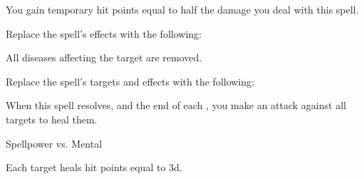 
You gain temporary hit points equal to half the damage you deal with this spell.









Replace the spell's effects with the following:
\begin{spellcontent}

\begin{augmenteffects}



\spelleffect
All diseases affecting the target are removed.








\end{augmenteffects}

\end{spellcontent}








Replace the spell's targets and effects with the following:
\begin{spellcontent}

\begin{augmenttargetinginfo}




\end{augmenttargetinginfo}


\begin{augmenteffects}



\spelleffect
When this spell resolves, and the end of each , you make an attack against all targets to heal them.




\begin{spellattack}{Spellpower vs. Mental}


\hit
Each target heals hit points equal to  \minus3d.



\end{spellattack}





\end{augmenteffects}

\end{spellcontent}





